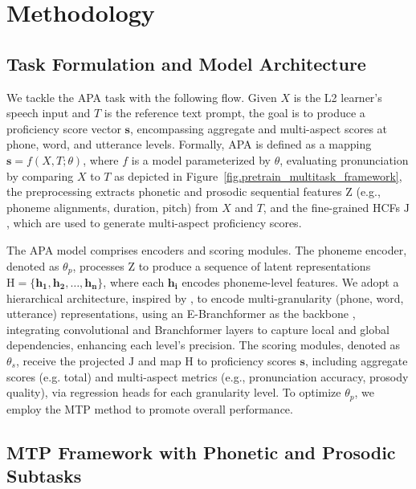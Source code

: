 \documentclass[conference,a4paper]{APSIPA2025}
\begin{document}
\section{Methodology}
\label{sec:methodology}

\subsection{Task Formulation and Model Architecture}
\label{subsec:task_formulation_and_model_architecture}

We tackle the APA task with the following flow. Given $X$ is the L2 learner’s speech input and $T$ is the reference text prompt, the goal is to produce a proficiency score vector $\mathbf{s}$, encompassing aggregate and multi-aspect scores at phone, word, and utterance levels. Formally, APA is defined as a mapping $\mathbf{s} = f(X, T; \theta)$, where $f$ is a model parameterized by $\theta$, evaluating pronunciation by comparing $X$ to $T$ \cite{kheir_etal_2023_automatic} as depicted in Figure~\ref{fig.pretrain_multitask_framework}, the preprocessing extracts phonetic and prosodic sequential features $\text{Z}$ (e.g., phoneme alignments, duration, pitch) from $X$ and $T$, and the fine-grained HCFs $\text{J}$, which are used to generate multi-aspect proficiency scores.

The APA model comprises encoders and scoring modules. The phoneme encoder, denoted as $\theta_p$, processes $\text{Z}$ to produce a sequence of latent representations $\text{H} = \{\mathbf{h_1}, \mathbf{h_2}, \dots, \mathbf{h_n}\}$, where each $\mathbf{h_i}$ encodes phoneme-level features. We adopt a hierarchical architecture, inspired by \cite{10890778}, to encode multi-granularity (phone, word, utterance) representations, using an E-Branchformer as the backbone \cite{10022656}, integrating convolutional and Branchformer layers to capture local and global dependencies, enhancing each level's precision. The scoring modules, denoted as $\theta_s$, receive the projected $\text{J}$ and map $\text{H}$ to proficiency scores $\mathbf{s}$, including aggregate scores (e.g. total) and multi-aspect metrics (e.g., pronunciation accuracy, prosody quality), via regression heads for each granularity level. To optimize $\theta_p$, we employ the MTP method to promote overall performance.

\subsection{MTP Framework with Phonetic and Prosodic Subtasks}
\label{subsec:mtp_framework_with_phonetic_and_prosodic_subtasks}
\end{document}
